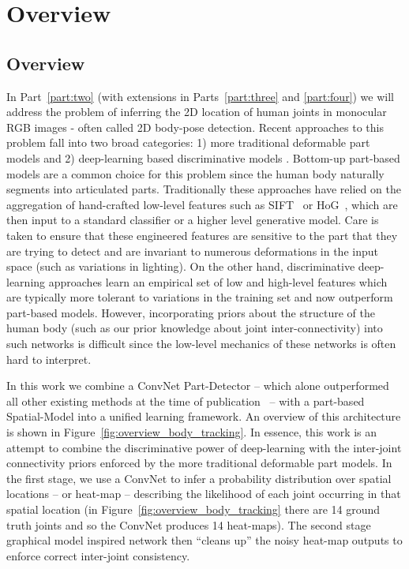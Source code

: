 \chapter{Overview\label{chap:2_body_tracking_overview}}

\section{Overview}

In Part~\ref{part:two} (with extensions in Parts~\ref{part:three} and \ref{part:four}) we will address the problem of inferring the 2D location of human joints in monocular RGB images - often called 2D body-pose detection. Recent approaches to this problem fall into two broad categories: 1) more traditional deformable part models \cite{modec} and 2) deep-learning based discriminative models \cite{deeppose, arjunaccv2014, jainiclr2014, tompson_efficient, tompsonnips2014}. Bottom-up part-based models are a common choice for this problem since the human body naturally segments into articulated parts. Traditionally these approaches have relied on the aggregation of hand-crafted low-level features such as SIFT~\cite{lowe1999object} or HoG~\cite{Dalal2005}, which are then input to a standard classifier or a higher level generative model. Care is taken to ensure that these engineered features are sensitive to the part that they are trying to detect and are invariant to numerous deformations in the input space (such as variations in lighting). On the other hand, discriminative deep-learning approaches learn an empirical set of low and high-level features which are typically more tolerant to variations in the training set and now outperform part-based models. However, incorporating priors about the structure of the human body (such as our prior knowledge about joint inter-connectivity) into such networks is difficult since the low-level mechanics of these networks is often hard to interpret. 

In this work we combine a ConvNet Part-Detector -- which alone outperformed all other existing methods at the time of publication~\cite{tompsonnips2014} -- with a part-based Spatial-Model into a unified learning framework. An overview of this architecture is shown in Figure~\ref{fig:overview_body_tracking}. In essence, this work is an attempt to combine the discriminative power of deep-learning with the inter-joint connectivity priors enforced by the more traditional deformable part models. In the first stage, we use a ConvNet to infer a probability distribution over spatial locations -- or heat-map -- describing the likelihood of each joint occurring in that spatial location (in Figure~\ref{fig:overview_body_tracking} there are 14 ground truth joints and so the ConvNet produces 14 heat-maps). The second stage graphical model inspired network then ``cleans up'' the noisy heat-map outputs to enforce correct inter-joint consistency.

